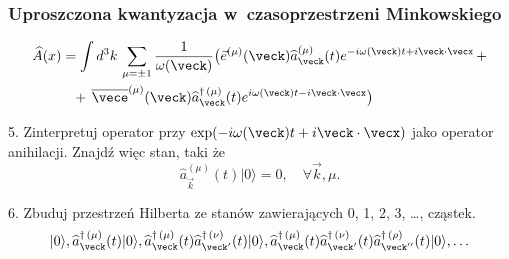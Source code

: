 \documentclass[10pt,t]{beamer}
\begin{document}
\begin{frame}
  \frametitle{Uproszczona kwantyzacja w~czasoprzestrzeni Minkowskiego}


  \begin{equation}
    \label{eq:Niespodziewane-teoretyczne-05}
    \begin{split}
      \widehat{A}( x )
      &=
        \int d^{ 3 }k \, \sum_{ \mu = \pm 1 } \frac{ 1 }{ \omega( \veck ) }
        \big( \vec{ e }^{ ( \mu ) }( \veck )
        \widehat{a}_{ \veck }^{ ( \mu ) }( t )
        e^{ -i \omega( \veck ) t + i \veck \cdot \vecx } \, + \\
      &\hphantom{=} + \, \overline{ \vece }^{ ( \mu ) }( \veck )
        \widehat{a}_{ \veck }^{ \dagger \, ( \mu ) }( t )
        e^{ i \omega( \veck ) t - i \veck \cdot \vecx } \big)
    \end{split}
  \end{equation}

  5. Zinterpretuj operator przy
  $\exp( -i \omega( \veck ) t + i \veck \cdot \vecx )$
  jako operator anihilacji. Znajdź więc stan, taki że
  \begin{equation}
    \label{eq:Niespodziewane-teoretyczne-06}
    \widehat{a}_{ \vec{ k } }^{ ( \mu ) }( t ) | 0 \rangle = 0, \quad
    \forall \vec{ k }, \mu.
  \end{equation}

  6. Zbuduj przestrzeń Hilberta ze stanów zawierających 0, 1, 2, 3,
  \ldots, cząstek.
  \begin{equation}
    \label{eq:Niespodziewane-teoretyczne-07}
    | 0 \rangle, \widehat{a}^{ \dagger \, ( \mu ) }_{ \veck }( t ) | 0 \rangle,
    \widehat{a}^{ \dagger \, ( \mu ) }_{ \veck }( t )
    \widehat{a}^{ \dagger \, ( \nu ) }_{ \veck' }( t ) | 0 \rangle,
    \widehat{a}^{ \dagger \, ( \mu ) }_{ \veck }( t )
    \widehat{a}^{ \dagger \, ( \nu ) }_{ \veck' }( t )
    \widehat{a}^{ \dagger \, ( \rho ) }_{ \veck'' }( t ) | 0 \rangle, \ldots
  \end{equation}

\end{frame}
\end{document}
